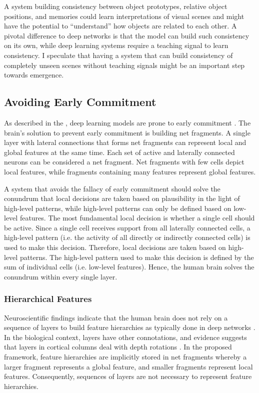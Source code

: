 A system building consistency between object prototypes, relative object positions, and memories could learn interpretations of visual scenes and might have the potential to ``understand'' how objects are related to each other. A pivotal difference to deep networks is that the model can build such consistency on its own, while deep learning systems require a teaching signal to learn consistency.
I speculate that having a system that can build consistency of completely unseen scenes without teaching signals might be an important step towards emergence.


\subsection{Avoiding Early Commitment}
As described in the , deep learning models are prone to early commitment .
The brain's solution to prevent early commitment is building net fragments.
A single layer with lateral connections that forms net fragments can represent local and global features at the same time.
Each set of active and laterally connected neurons can be considered a net fragment. Net fragments with few cells depict local features, while fragments containing many features represent global features.

A system that avoids the fallacy of early commitment should solve the conundrum that local decisions are taken based on plausibility in the light of high-level patterns, while high-level patterns can only be defined based on low-level features.
The most fundamental local decision is whether a single cell should be active. Since a single cell receives support from all laterally connected cells, a high-level pattern (i.e. the activity of all directly or indirectly connected cells) is used to make this decision. Therefore, local decisions are taken based on high-level patterns. The high-level pattern used to make this decision is defined by the sum of individual cells (i.e. low-level features). Hence, the human brain solves the conundrum within every single layer.


\subsubsection{Hierarchical Features}
Neuroscientific findings indicate that the human brain does not rely on a sequence of layers to build feature hierarchies as typically done in deep networks .
In the biological context, layers have other connotations, and evidence suggests that layers in cortical columns deal with depth rotations .
In the proposed framework, feature hierarchies are implicitly stored in net fragments whereby a larger fragment represents a global feature, and smaller fragments represent local features.
Consequently, sequences of layers are not necessary to represent feature hierarchies.

